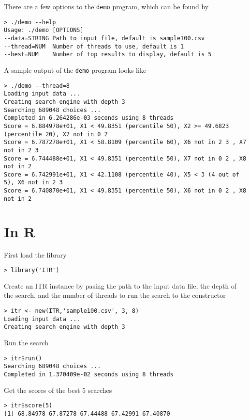 There are a few options to the {\tt demo} program, which can be found by
\begin{verbatim}
> ./demo --help
Usage: ./demo [OPTIONS]
--data=STRING Path to input file, default is sample100.csv
--thread=NUM  Number of threads to use, default is 1
--best=NUM    Number of top results to display, default is 5
\end{verbatim} 

A sample output of the {\tt demo} program looks like
\begin{verbatim}
> ./demo --thread=8
Loading input data ...
Creating search engine with depth 3
Searching 689048 choices ...
Completed in 6.264286e-03 seconds using 8 threads
Score = 6.884978e+01, X1 < 49.8351 (percentile 50), X2 >= 49.6823 (percentile 20), X7 not in 0 2 
Score = 6.787278e+01, X1 < 58.8109 (percentile 60), X6 not in 2 3 , X7 not in 2 3 
Score = 6.744488e+01, X1 < 49.8351 (percentile 50), X7 not in 0 2 , X8 not in 2 
Score = 6.742991e+01, X1 < 42.1108 (percentile 40), X5 < 3 (4 out of 5), X6 not in 2 3 
Score = 6.740870e+01, X1 < 49.8351 (percentile 50), X6 not in 0 2 , X8 not in 2 
\end{verbatim} 


\section{In R}

First load the library
\begin{verbatim} 
> library('ITR')
\end{verbatim}

Create an ITR instance by pasing the path to the input data file, the depth of the search, and the number of threads to run the search to the constructor
\begin{verbatim}
> itr <- new(ITR,'sample100.csv', 3, 8)
Loading input data ...
Creating search engine with depth 3
\end{verbatim}

Run the search
\begin{verbatim}
> itr$run()
Searching 689048 choices ...
Completed in 1.370409e-02 seconds using 8 threads
\end{verbatim}

Get the scores of the best 5 searches
\begin{verbatim}
> itr$score(5)
[1] 68.84978 67.87278 67.44488 67.42991 67.40870
\end{verbatim}

